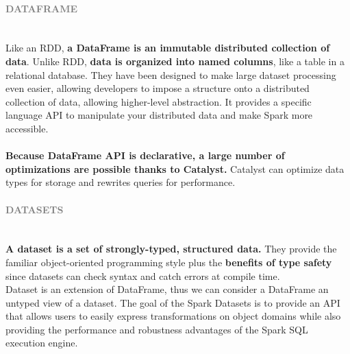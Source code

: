 \documentclass[10pt,a4paper]{article}
\newcommand{\nline}{\\~\\}
\newcommand{\myparagraph}[1]{\paragraph{\normalsize{\textcolor{gray}{\uppercase{\textbf{#1}}}} }\mbox{} \vspace{0.5em}\\}
\begin{document}
\myparagraph{DataFrame}
Like an RDD, \textbf{a DataFrame is an immutable distributed collection of data}. Unlike RDD, \textbf{data is organized into named columns}, like a table in a relational database. They have been designed to make large dataset processing even easier, allowing developers to impose a structure onto a distributed collection of data, allowing higher-level abstraction. It provides a specific language API to manipulate your distributed data and make Spark more accessible.
\nline
\textbf{Because DataFrame API is declarative, a large number of optimizations are possible thanks to Catalyst.} Catalyst can optimize data types for storage and rewrites queries for performance.

\myparagraph{Datasets}
\textbf{A dataset is a set of strongly-typed, structured data.} They provide the familiar object-oriented programming style plus the \textbf{benefits of type safety} since datasets can check syntax and catch errors at compile time. \\
Dataset is an extension of DataFrame, thus we can consider a DataFrame an untyped view of a dataset. The goal of the Spark Datasets is to provide an API that allows users to easily express transformations on object domains while also providing the performance and robustness advantages of the Spark SQL execution engine.
\pagebreak
\end{document}

